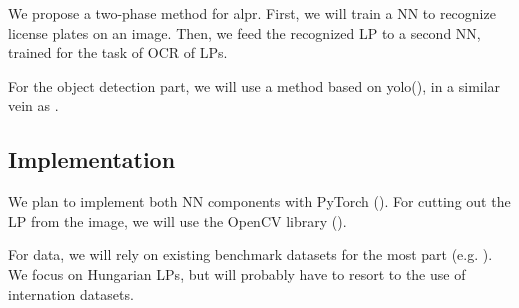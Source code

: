 We propose a two-phase method for \ac{alpr}. First, we will train a \ac{NN} to
recognize license plates on an image. Then, we feed the recognized \ac{LP} to
a second \ac{NN}, trained for the task of \ac{OCR} of \ac{LP}s.

For the object detection part, we will use a method based on
\ac{yolo}(\cite{redmon2016look}), in a similar vein as
\cite{DBLP:journals/corr/abs-1909-01754}. 

\subsection{Implementation}
We plan to implement both \ac{NN} components with PyTorch (\cite{pytorch}).
For cutting out the \ac{LP} from the image, we will use the OpenCV library
(\cite{opencv}).

For data, we will rely on existing benchmark datasets for the most part (e.g.
\cite{DBLP:journals/corr/GoncalvesSMS16}). We focus on Hungarian \ac{LP}s, but
will probably have to resort to the use of internation datasets.
